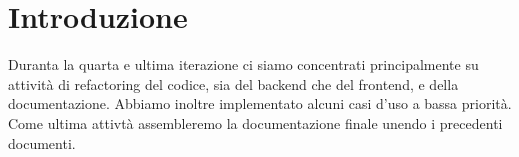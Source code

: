 \section{Introduzione}
Duranta la quarta e ultima iterazione ci siamo concentrati principalmente su attività di refactoring del codice, sia del backend che del frontend, e della documentazione. Abbiamo inoltre implementato alcuni casi d'uso a bassa priorità. Come ultima attivtà assembleremo la documentazione finale unendo i precedenti documenti.